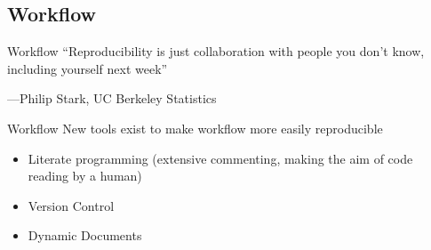 \documentclass{beamer}
\begin{document}
 \subsection{Workflow}
 \begin{frame}{Workflow}
``Reproducibility is just collaboration with people you don't know,
including yourself next week''

---Philip Stark, UC Berkeley Statistics
\end{frame}
\begin{frame}{Workflow}
New tools exist to make workflow more easily reproducible
 \begin{itemize}[<.->]
 \item Literate programming (extensive commenting, making the aim of code reading by a human)
 \item Version Control
 \item Dynamic Documents
\end{itemize}
\end{frame}



\end{document}
